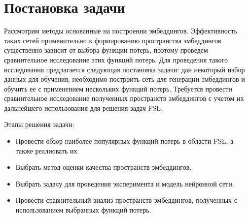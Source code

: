 \section{Постановка задачи}
\label{sec:Chapter2} 

Рассмотрим методы основанные на построении эмбеддингов. Эффективность таких сетей применительно к формированию пространства эмбеддингов существенно зависит от выбора функции потерь, поэтому проведем сравнительное исследование этих функций потерь. Для проведения такого исследования предлагается следующая постановка задачи: дан некоторый набор данных для обучения, необходимо построить сеть для генерации эмбеддингов и обучить ее с применением нескольких функций потерь. Требуется провести сравнительное исследование полученных пространств эмбеддингов с учетом их дальнейшего использования для решения задач FSL.

Этапы решения задачи:
\begin{itemize}
    \item Провести обзор наиболее популярных функций потерь в области FSL, а также реалиовать их.
    \item Выбрать метод оценки качества пространств эмбеддингов.
    \item Выбрать задачу для проведения эксперимента и модель нейронной сети.
    \item Провести сравнительный анализ пространств эмбеддингов, полученных с использованием выбранных функций потерь.
\end{itemize}